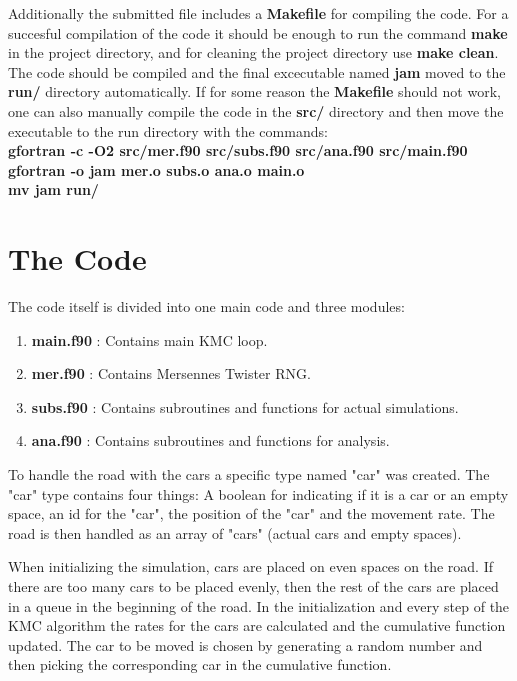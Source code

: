 \documentclass[a4paper,12pt]{article}
\begin{document}
Additionally the submitted file includes a {\bf{Makefile}} for compiling the code. For a succesful compilation of the code it should be enough to run the command {\bf{make}} in the project directory, and for cleaning the project directory use {\bf{make clean}}. The code should be compiled and the final excecutable named {\bf{jam}} moved to the {\bf{run/}} directory automatically. If for some reason the {\bf{Makefile}} should not work, one can also manually compile the code in the {\bf{src/}} directory and then move the executable to the run directory with the commands: \\

	{\bf{gfortran -c -O2 src/mer.f90 src/subs.f90 src/ana.f90 src/main.f90}} \\
	{\bf{gfortran -o jam mer.o subs.o ana.o main.o}} \\
	{\bf{mv jam run/}}

\newpage
\section{The Code}
The code itself is divided into one main code and three modules:

\begin{enumerate}
\item {\bf{main.f90}} : Contains main KMC loop.
\item {\bf{mer.f90}} : Contains Mersennes Twister RNG.
\item {\bf{subs.f90}} : Contains subroutines and functions for actual simulations.
\item {\bf{ana.f90}} : Contains subroutines and functions for analysis.

\end{enumerate}


To handle the road with the cars a specific type named "car" was created. The "car" type contains four things: A boolean for indicating if it is a car or an empty space, an id for the "car", the position of the "car" and the movement rate. The road is then handled as an array of "cars" (actual cars and empty spaces).

When initializing the simulation, cars are placed on even spaces on the road. If there are too many cars to be placed evenly, then the rest of the cars are placed in a queue in the beginning of the road. In the initialization and every step of the KMC algorithm the rates for the cars are calculated and the cumulative function updated. The car to be moved is chosen by generating a random number and then picking the corresponding car in the cumulative function.
\end{document}
